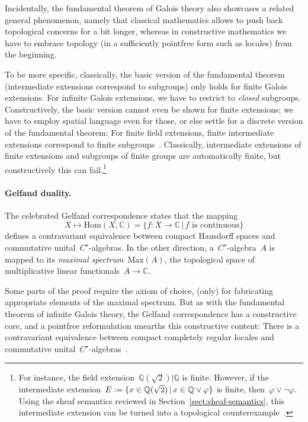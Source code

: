 \documentclass{ws-rv9x6}
\newcommand{\QQ}{\mathbb{Q}}
\newcommand{\CC}{\mathbb{C}}
\newcommand{\defeq}{\vcentcolon=}
\newcommand{\Hom}{\mathrm{Hom}}
\newcommand{\Max}{\mathrm{Max}}
\renewcommand{\_}{\mathpunct{.}}
\newcommand{\?}{\,{:}\,}
\begin{document}
\begin{remark}Incidentally, the fundamental theorem of Galois theory also
showcases a related general phenomenon, namely that classical mathematics
allows to push back topological concerns for a bit longer,
whereas in constructive mathematics we have to embrace topology
(in a sufficiently pointfree form such as locales) from the beginning.

To be more specific, classically, the basic version of the fundamental theorem
(intermediate extensions correspond to subgroups) only holds for finite Galois
extensions. For infinite Galois extensions, we have to restrict to
\emph{closed} subgroups. Constructively, the basic version cannot even be shown
for finite extensions; we have to employ spatial language even for those, or
else settle for a discrete version of the fundamental theorem: For finite field
extensions, finite intermediate extensions correspond to finite
subgroups~\cite[Theorem~8.8]{mines-richman-ruitenburg:constructive-algebra}.
Classically, intermediate extensions of finite extensions and subgroups of
finite groups are automatically finite, but constructively this can
fail.\footnote{For instance, the field extension~$\QQ(\sqrt{2})|\QQ$ is finite.
However, if the intermediate extension~$E \defeq \{ x \in \QQ(\sqrt{2}) \,|\, x
\in \QQ \vee \varphi \}$ is finite, then~$\varphi \vee \neg\varphi$. Using the
sheaf semantics reviewed in Section~\ref{sect:sheaf-semantics}, this
intermediate extension can be turned into a topological
counterexample~\cite[page~65]{wraith:localic-groups}.}
\end{remark}

\paragraph{Gelfand duality.} The celebrated Gelfand correspondence states that
the mapping
\[ X \longmapsto \Hom(X, \CC) = \{ f : X \to \CC \,|\, \text{$f$ is continuous} \} \]
defines a contravariant equivalence between compact Hausdorff spaces and
commutative unital~$C^\star$-algebras. In the other direction,
a~$C^\star$-algebra~$A$ is mapped to its \emph{maximal spectrum}~$\Max(A)$, the
topological space of multiplicative linear functionals~$A \to \CC$.

Some parts of the proof require the axiom of choice, (only) for fabricating
appropriate elements of the maximal spectrum. But as with the fundamental
theorem of infinite Galois theory, the Gelfand correspondence has a
constructive core, and a pointfree reformulation unearths this constructive
content: There is a contravariant equivalence between compact completely
regular locales and commutative
unital~$C^\star$-algebras~\cite{banaschewski-mulvey:gelfand,coquand-spitters:gelfand,henry:gelfand}.
\end{document}
